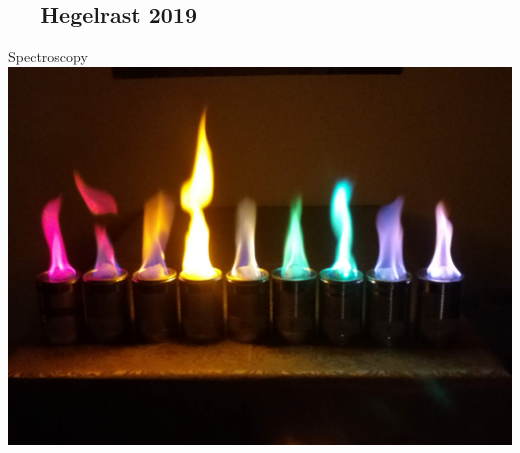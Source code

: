 \subsection{\ccbysa ~~ Hegelrast 2019 }
\begin{frame}{Spectroscopy} \centering
    \includegraphics[width=.9\textwidth]{Figures Lecture on Hadrons/Spectrosopy.jpg}
\end{frame}
\subsection{}


